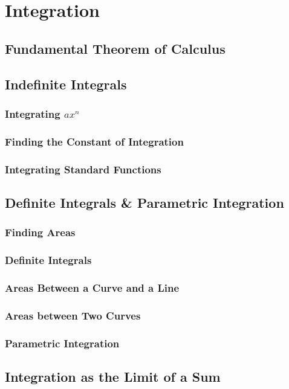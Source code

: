 \documentclass[../alevelmaths.tex]{subfiles}
\begin{document}
\chapter{Integration}
\section{Fundamental Theorem of Calculus}
\section{Indefinite Integrals}
\subsection*{Integrating \texorpdfstring{$ax^n$}{ax to the n}}
\subsection*{Finding the Constant of Integration}
\subsection*{Integrating Standard Functions}
\section{Definite Integrals \& Parametric Integration}
\subsection*{Finding Areas}
\subsection*{Definite Integrals}
\subsection*{Areas Between a Curve and a Line}
\subsection*{Areas between Two Curves}
\subsection*{Parametric Integration}
\section{Integration as the Limit of a Sum}
\end{document}
